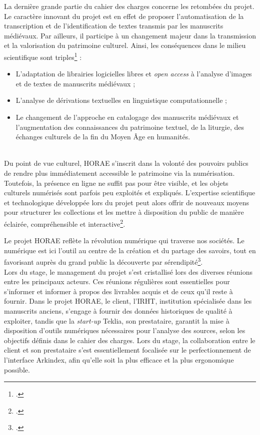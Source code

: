 \documentclass[a4paper,12pt,twoside]{book}
\begin{document}
	    La dernière grande partie du cahier des charges concerne les retombées du projet. Le caractère innovant du projet est en effet de proposer l'automatisation de la transcription et de l'identification de textes transmis par les manuscrits médiévaux. Par ailleurs, il participe à un changement majeur dans la transmission et la valorisation du patrimoine culturel. Ainsi, les conséquences dans le milieu scientifique sont triples\footcite[p. 17-18]{HORAE_projet} : 
	    \begin{itemize}
	        \item L'adaptation de librairies logicielles libres et \textit{open access} à l'analyse d'images et de textes de manuscrits médiévaux ;
	        \item L'analyse de dérivations textuelles en linguistique computationnelle ;
	        \item Le changement de l'approche en catalogage des manuscrits médiévaux et l'augmentation des connaissances du patrimoine textuel, de la liturgie, des échanges culturels de la fin du Moyen Âge en humanités. 
	    \end{itemize}\\
	    
	    Du point de vue culturel, HORAE s'inscrit dans la volonté des pouvoirs publics de rendre plus immédiatement accessible le patrimoine via la numérisation. Toutefois, la présence en ligne ne suffit pas pour être visible, et les objets culturels numérisés sont parfois peu exploités et expliqués. L'expertise scientifique et technologique développée lors du projet peut alors offrir de nouveaux moyens pour structurer les collections et les mettre à disposition du public de manière éclairée, compréhensible et interactive\footcite[p. 18]{HORAE_projet}.  
	    
	    Le projet HORAE reflète la \og révolution numérique\fg{} qui traverse nos sociétés. Le numérique est ici l'outil au centre de la création et du partage des savoirs, tout en favorisant auprès du grand public la découverte par sérendipité\footcite[p. 18-19]{HORAE_projet}. \\
	    
	    Lors du stage, le management du projet s'est cristallisé lors des diverses réunions entre les principaux acteurs. Ces réunions régulières sont essentielles pour s'informer et informer à propos des livrables acquis et de ceux qu'il reste à fournir. Dans le projet HORAE, le client, l'IRHT, institution spécialisée dans les manuscrits anciens, s'engage à fournir des données historiques de qualité à exploiter, tandis que la \textit{start-up} Teklia, son prestataire, garantit la mise à disposition d'outils numériques nécessaires pour l'analyse des sources, selon les objectifs définis dans le cahier des charges. Lors du stage, la collaboration entre le client et son prestataire s'est essentiellement focalisée sur le perfectionnement de l'interface Arkindex, afin qu'elle soit la plus efficace et la plus ergonomique possible. 
\end{document}

